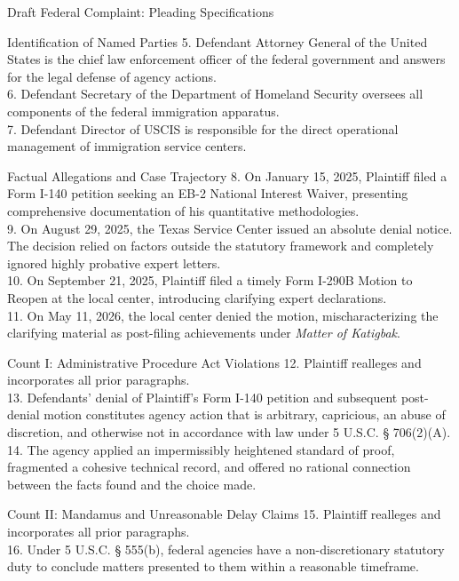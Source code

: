 \documentclass[11pt]{beamer}
\begin{document}
\begin{frame}[allowframebreaks]{Draft Federal Complaint: Pleading Specifications}
\begin{block}{Identification of Named Parties}
			5. Defendant Attorney General of the United States is the chief law enforcement officer of the federal government and answers for the legal defense of agency actions. \\
			6. Defendant Secretary of the Department of Homeland Security oversees all components of the federal immigration apparatus. \\
			7. Defendant Director of USCIS is responsible for the direct operational management of immigration service centers.
		\end{block}
		\framebreak
		\begin{block}{Factual Allegations and Case Trajectory}
			8. On January 15, 2025, Plaintiff filed a Form I-140 petition seeking an EB-2 National Interest Waiver, presenting comprehensive documentation of his quantitative methodologies. \\
			9. On August 29, 2025, the Texas Service Center issued an absolute denial notice. The decision relied on factors outside the statutory framework and completely ignored highly probative expert letters. \\
			10. On September 21, 2025, Plaintiff filed a timely Form I-290B Motion to Reopen at the local center, introducing clarifying expert declarations. \\
			11. On May 11, 2026, the local center denied the motion, mischaracterizing the clarifying material as post-filing achievements under \textit{Matter of Katigbak}.
		\end{block}
		\framebreak
		\begin{block}{Count I: Administrative Procedure Act Violations}
			12. Plaintiff realleges and incorporates all prior paragraphs. \\
			13. Defendants' denial of Plaintiff's Form I-140 petition and subsequent post-denial motion constitutes agency action that is arbitrary, capricious, an abuse of discretion, and otherwise not in accordance with law under 5 U.S.C. § 706(2)(A). \\
			14. The agency applied an impermissibly heightened standard of proof, fragmented a cohesive technical record, and offered no rational connection between the facts found and the choice made.
		\end{block}
		\framebreak
		\begin{block}{Count II: Mandamus and Unreasonable Delay Claims}
			15. Plaintiff realleges and incorporates all prior paragraphs. \\
			16. Under 5 U.S.C. § 555(b), federal agencies have a non-discretionary statutory duty to conclude matters presented to them within a reasonable timeframe. \\

\end{block}
\end{frame}
\end{document}
